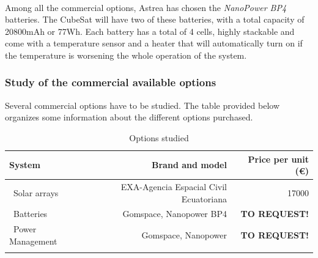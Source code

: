 \paragraph{}Among all the commercial options, Astrea has chosen the \textit{NanoPower BP4} batteries. The CubeSat will have two of these batteries, with a total capacity of 20800mAh or 77Wh. Each battery has a total of 4 cells, highly stackable and come with a temperature sensor and a heater that will automatically turn on if the temperature is worsening the whole operation of the system. 

\subsubsection{Study of the commercial available options}
Several commercial options have to be studied. The table provided below organizes some information about the different options purchased.

\begin{longtable}{| l | r | r | }
\hline
\rowcolor[gray]{0.80}	\textbf{System} &  \textbf{Brand and model}     & \textbf{Price per unit (\euro)}   \\
\hline
\endfirsthead

	   ~Solar arrays & EXA-Agencia Espacial Civil Ecuatoriana & 17000 \\
	   ~Batteries & Gomspace, Nanopower BP4 & \textbf{TO REQUEST!} \\
	   ~Power Management & Gomspace, Nanopower & \textbf{TO REQUEST!} \\
	\hline

\caption{Options studied}
\label{epsoptionstable}
\end{longtable}